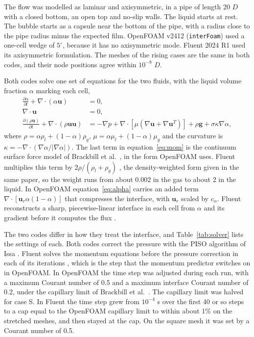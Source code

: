 \documentclass[11pt,a4paper]{article}
\begin{document}
The flow was modelled as laminar and axisymmetric, in a pipe of length 20 $D$ with a closed bottom, an open top and no-slip walls. The liquid starts at rest. The bubble starts as a capsule near the bottom of the pipe, with a radius close to the pipe radius minus the expected film. OpenFOAM v2412 \cite{weller1998tensorial} (\texttt{interFoam}) used a one-cell wedge of $5^\circ$, because it has no axisymmetric mode. Fluent 2024 R1 used its axisymmetric formulation. The meshes of the rising cases are the same in both codes, and their node positions agree within $10^{-8}$ $D$.

Both codes solve one set of equations for the two fluids, with the liquid volume fraction $\alpha$ marking each cell,
\begin{align}
\frac{\partial \alpha}{\partial t} + \nabla\cdot(\alpha\mathbf{u}) &= 0, \label{eq:alpha}\\
\nabla\cdot\mathbf{u} &= 0, \\
\frac{\partial (\rho\mathbf{u})}{\partial t} + \nabla\cdot(\rho\mathbf{u}\mathbf{u}) &= -\nabla p + \nabla\cdot\left[\mu\left(\nabla\mathbf{u}+\nabla\mathbf{u}^{T}\right)\right] + \rho\mathbf{g} + \sigma\kappa\nabla\alpha, \label{eq:mom}
\end{align}
where $\rho = \alpha\rho_l + (1-\alpha)\rho_g$, $\mu = \alpha\mu_l + (1-\alpha)\mu_g$ and the curvature is $\kappa = -\nabla\cdot(\nabla\alpha/|\nabla\alpha|)$. The last term in equation~\eqref{eq:mom} is the continuum surface force model of Brackbill et al.\ \cite{brackbill1992continuum}, in the form OpenFOAM uses. Fluent multiplies this term by $2\rho/(\rho_l+\rho_g)$ \cite{ansys2024fluenttheory}, the density-weighted form given in the same paper, so the weight runs from about 0.002 in the gas to about 2 in the liquid. In OpenFOAM equation~\eqref{eq:alpha} carries an added term $\nabla\cdot[\mathbf{u}_r\alpha(1-\alpha)]$ that compresses the interface, with $\mathbf{u}_r$ scaled by $c_\alpha$. Fluent reconstructs a sharp, piecewise-linear interface in each cell from $\alpha$ and its gradient before it computes the flux \cite{ansys2024fluenttheory}.

The two codes differ in how they treat the interface, and Table~\ref{tab:solver} lists the settings of each. Both codes correct the pressure with the PISO algorithm of Issa \cite{issa1986solution}. Fluent solves the momentum equations before the pressure correction in each of its iterations \cite{ansys2024fluenttheory}, which is the step that the momentum predictor switches on in OpenFOAM. In OpenFOAM the time step was adjusted during each run, with a maximum Courant number of 0.5 and a maximum interface Courant number of 0.2, under the capillary limit of Brackbill et al.\ \cite{brackbill1992continuum}. The capillary limit was halved for case S. In Fluent the time step grew from $10^{-4}$ s over the first 40 or so steps to a cap equal to the OpenFOAM capillary limit to within about 1\% on the stretched meshes, and then stayed at the cap. On the square mesh it was set by a Courant number of 0.5.
\end{document}
